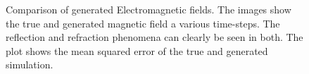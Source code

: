 \documentclass{article}
\begin{document}
\begin{figure}[!t]
\caption{ Comparison of generated Electromagnetic fields. The images show the true and generated magnetic field a various time-steps. The reflection and refraction phenomena can clearly be seen in both. The plot shows the mean squared error of the true and generated simulation.}
\label{em_dataset}
\end{figure}
\end{document}
